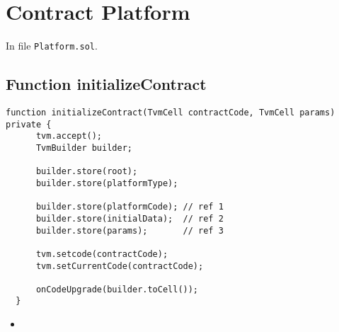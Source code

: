 
\section{Contract Platform}

In file {\tt Platform.sol}.

\subsection{Function initializeContract}

\begin{lstlisting}[firstnumber=18]
  function initializeContract(TvmCell contractCode, TvmCell params) private {
      tvm.accept();
      TvmBuilder builder;

      builder.store(root);
      builder.store(platformType);

      builder.store(platformCode); // ref 1
      builder.store(initialData);  // ref 2
      builder.store(params);       // ref 3

      tvm.setcode(contractCode);
      tvm.setCurrentCode(contractCode);

      onCodeUpgrade(builder.toCell());
  }
\end{lstlisting}

\noindent\begin{itemize}
  \item {}
\end{itemize}

